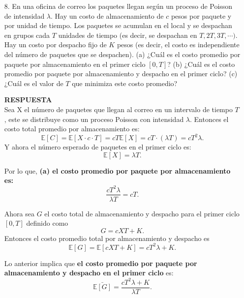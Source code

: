 \documentclass[11pt,letterpaper]{article}
\newcommand{\mE}{\mathbb{E}}
\newcommand{\res}{\textbf{RESPUESTA}\\}
\begin{document}
\begin{itemize}
\item[8.] En una oficina de correo los paquetes llegan según un proceso de Poisson de intensidad $\lambda$. Hay un costo de almacenamiento de $c$ pesos por paquete y por unidad de tiempo. Los paquetes se acumulan en el local y se despachan en grupos cada $T$ unidades de tiempo (es decir, se despachan en $T , 2T , 3T , \cdots)$. Hay un costo por despacho fijo de $K$ pesos (es decir, el costo es independiente del número de paquetes que se despachen). (a) ¿Cuál es el costo promedio por paquete por almacenamiento en el primer ciclo $[0, T ]$? (b) ¿Cuál es el costo promedio por paquete por almacenamiento y despacho en el primer ciclo? (c) ¿Cuál es el valor de $T$ que minimiza este costo promedio?

\res 
Sea X el número de paquetes que llegan al correo en un intervalo de tiempo $T$, este se distribuye como un proceso Poisson con intensidad $\lambda$. Entonces el costo total promedio por almacenamiento es: 
$$\mE[C]=\mE[X\cdot c \cdot T]=cT\mE[X]=cT\cdot (\lambda T)=cT^2\lambda.$$
Y ahora el número esperado de paquetes en el primer ciclo es: 
$$\mE[X]=\lambda T.$$

Por lo que, \textbf{(a) el costo promedio por paquete por almacenamiento es:}
$$\frac{cT^2\lambda}{\lambda T}=cT.$$

Ahora sea $G$ el costo total de almacenamiento y despacho para el primer ciclo $[0,T]$ definido como
$$G=cXT+K.$$
Entonces el costo promedio total por almacenamiento y despacho es
$$\mE[G]=\mE[cXT+K]=cT^2\lambda+K.$$

Lo anterior implica que \textbf{el costo promedio por paquete por almacenamiento y despacho en el primer ciclo} es:
$$\bar{\mE[G]}=\frac{cT^2\lambda+K}{\lambda T}.$$


\end{itemize}
\end{document}
